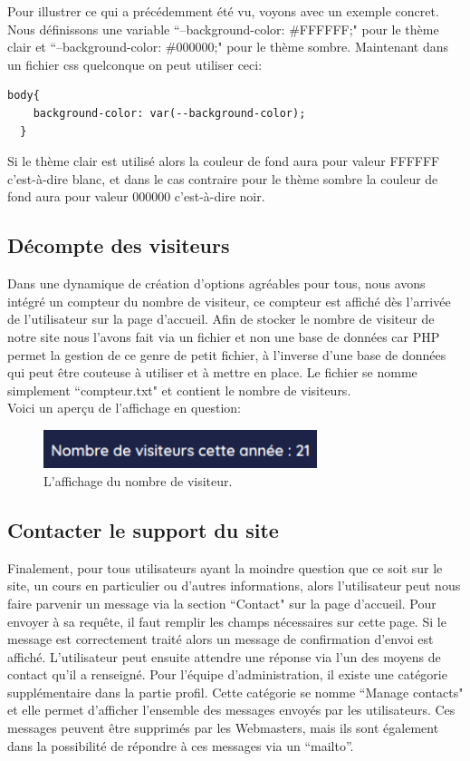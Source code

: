 \documentclass[a4paper,11pt]{article}
\begin{document}
Pour illustrer ce qui a précédemment été vu, voyons avec un exemple concret. Nous définissons une variable ``--background-color: \#FFFFFF;" pour le thème clair et ``--background-color: \#000000;" pour le thème sombre. Maintenant dans un fichier css quelconque on peut utiliser ceci:
\begin{lstlisting}[language=HTML]
  body{
    background-color: var(--background-color);
  }
\end{lstlisting}
Si le thème clair est utilisé alors la couleur de fond aura pour valeur FFFFFF c'est-à-dire blanc, et dans le cas contraire pour le thème sombre la couleur de fond aura pour valeur 000000 c'est-à-dire noir.

\subsection{Décompte des visiteurs}
Dans une dynamique de création d'options agréables pour tous, nous avons intégré un compteur du nombre de visiteur, ce compteur est affiché dès l'arrivée de l'utilisateur sur la page d'accueil. Afin de stocker le nombre de visiteur de notre site nous l'avons fait via un fichier et non une base de données car PHP permet la gestion de ce genre de petit fichier, à l'inverse d'une base de données qui peut être couteuse à utiliser et à mettre en place. Le fichier se nomme simplement ``compteur.txt" et contient le nombre de visiteurs.\\
Voici un aperçu de l'affichage en question: 
\begin{figure}[!h]
\centerline{\includegraphics[width=8cm]{images/numberVisiteurs.PNG}}
\caption{L'affichage du nombre de visiteur.}
\label{fig}
\end{figure}

\subsection{Contacter le support du site}
Finalement, pour tous utilisateurs ayant la moindre question que ce soit sur le site, un cours en particulier ou d'autres informations, alors l'utilisateur peut nous faire parvenir un message via la section ``Contact" sur la page d'accueil. Pour envoyer à sa requête, il faut remplir les champs nécessaires sur cette page. Si le message est correctement traité alors un message de confirmation d'envoi est affiché. L'utilisateur peut ensuite attendre une réponse via l'un des moyens de contact qu'il a renseigné. Pour l'équipe d'administration, il existe une catégorie supplémentaire dans la partie profil. Cette catégorie se nomme ``Manage contacts" et elle permet d'afficher l'ensemble des messages envoyés par les utilisateurs. Ces messages peuvent être supprimés par les Webmasters, mais ils sont également dans la possibilité de répondre à ces messages via un ``mailto''.\\
\end{document}
